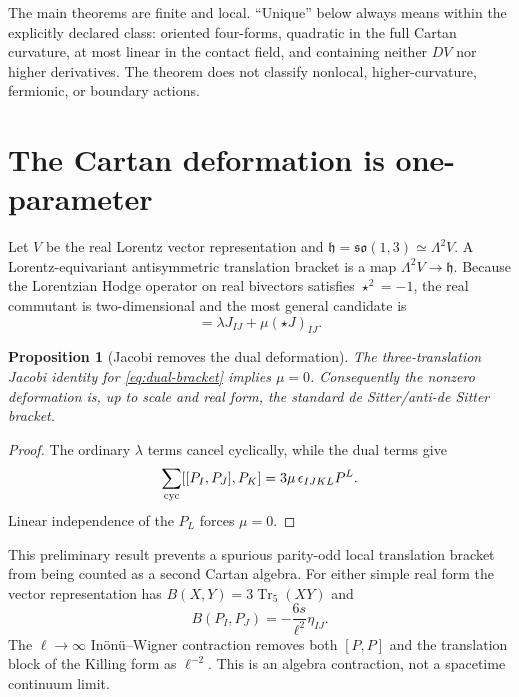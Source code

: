 \documentclass[11pt]{article}
\newtheorem{proposition}[theorem]{Proposition}
\theoremstyle{remark}\newtheorem{remark}[theorem]{Remark}
\newcommand{\Tr}{\operatorname{Tr}}
\newcommand{\so}{\mathfrak{so}}
\begin{document}
The main theorems are finite and local.  ``Unique'' below always means within the explicitly
declared class: oriented four-forms, quadratic in the full Cartan curvature, at most linear
in the contact field, and containing neither $DV$ nor higher derivatives.  The theorem does
not classify nonlocal, higher-curvature, fermionic, or boundary actions.

\section{The Cartan deformation is one-parameter}

Let $V$ be the real Lorentz vector representation and
$\mathfrak h=\so(1,3)\simeq\Lambda^2V$.  A Lorentz-equivariant antisymmetric translation
bracket is a map $\Lambda^2V\to\mathfrak h$.  Because the Lorentzian Hodge operator on real
bivectors satisfies $\star^2=-1$, the real commutant is two-dimensional and the most general
candidate is
\begin{equation}
 [P_I,P_J]=\lambda J_{IJ}+\mu(\star J)_{IJ}.
 \label{eq:dual-bracket}
\end{equation}

\begin{proposition}[Jacobi removes the dual deformation]
\label{prop:jacobi}
The three-translation Jacobi identity for \eqref{eq:dual-bracket} implies $\mu=0$.
Consequently the nonzero deformation is, up to scale and real form, the standard
de Sitter/anti-de Sitter bracket.
\end{proposition}

\begin{proof}
The ordinary $\lambda$ terms cancel cyclically, while the dual terms give
\begin{equation}
 \sum_{\rm cyc}[[P_I,P_J],P_K]=3\mu\,\epsilon_{IJKL}P^L.
 \label{eq:jacobi-fault}
\end{equation}
Linear independence of the $P_L$ forces $\mu=0$.
\end{proof}

This preliminary result prevents a spurious parity-odd local translation bracket from
being counted as a second Cartan algebra.  For either simple real form the vector
representation has $B(X,Y)=3\Tr_5(XY)$ and
\begin{equation}
 B(P_I,P_J)=-\frac{6s}{\ell^2}\eta_{IJ}.
 \label{eq:killing-form}
\end{equation}
The $\ell\to\infty$ In\"on\"u--Wigner contraction removes both $[P,P]$ and the translation
block of the Killing form as $\ell^{-2}$.  This is an algebra contraction, not a spacetime
continuum limit.
\end{document}
